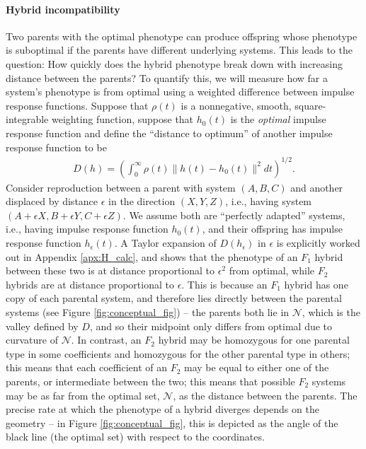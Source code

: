 \documentclass{article}
\newcommand{\1}{\mathbbm{1}}
\newcommand{\allS}{\mathcal{N}}
\begin{document}
\paragraph{Hybrid incompatibility}
Two parents with the optimal phenotype can produce offspring whose phenotype is suboptimal
if the parents have different underlying systems.
This leads to the question: 
How quickly does the hybrid phenotype break down with increasing distance between the parents?
To quantify this, we will measure how far a system's phenotype is from optimal
using a weighted difference between impulse response functions.
Suppose that $\rho(t)$ is a nonnegative, smooth, square-integrable weighting function,
suppose that $h_0(t)$ is the \emph{optimal} impulse response function 
and define the ``distance to optimum'' of another impulse response function
to be
\begin{align}
\label{eqn:distance}
	D(h) = \left( \int_0^\infty \rho(t) \|h(t) - h_0(t)\|^2 dt \right)^{1/2} .
\end{align}
Consider reproduction between a parent with system $(A, B, C)$ 
and another displaced by distance $\epsilon$ in the direction $(X,Y,Z)$,
i.e., having  system $(A + \epsilon X, B + \epsilon Y, C + \epsilon Z)$.
We assume both are ``perfectly adapted'' systems, 
i.e., having impulse response function $h_0(t)$,
and their offspring has impulse response function $h_\epsilon(t)$.
A Taylor expansion of $D(h_\epsilon)$ in $\epsilon$ is explicitly worked out in Appendix \ref{apx:H_calc},
and shows that the phenotype of an $F_1$ hybrid between these two is at distance proportional to $\epsilon^2$ from optimal,
while $F_2$ hybrids are at distance proportional to $\epsilon$.
This is because an $F_1$ hybrid has one copy of each parental system,
and therefore lies directly between the parental systems (see Figure \ref{fig:conceptual_fig}) --
the parents both lie in $\allS$, which is the valley defined by $D$,
and so their midpoint only differs from optimal due to curvature of $\allS$.
In contrast, an $F_2$ hybrid may be homozygous for one parental type in some coefficients
and homozygous for the other parental type in others;
this means that each coefficient of an $F_2$ may be equal to either one of the parents,
or intermediate between the two;
this means that possible $F_2$ systems may be as far from the optimal set, $\allS$,
as the distance between the parents.
The precise rate at which the phenotype of a hybrid diverges depends on the geometry --
in Figure \ref{fig:conceptual_fig}, this is depicted as the angle of the black line (the optimal set)
with respect to the coordinates.
\end{document}
